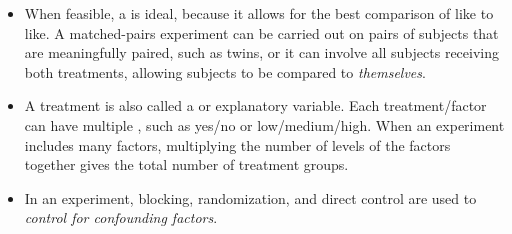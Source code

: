 \begin{itemize}
\item When feasible, a  is ideal, because it allows for the best comparison of like to like.  A matched-pairs experiment can be carried out on pairs of subjects that are meaningfully paired, such as twins, or it can involve all subjects receiving both treatments, allowing subjects to be compared to \textit{themselves}.  

\item A treatment is also called a  or explanatory variable.  Each treatment/factor can have multiple , such as yes/no or low/medium/high.  When an experiment includes many factors, multiplying the number of levels of the factors together gives the total number of treatment groups.  

\item In an experiment, blocking, randomization, and direct control are used to \textit{control for confounding factors}.

\end{itemize}


{}

\reviewchapterheader{}

